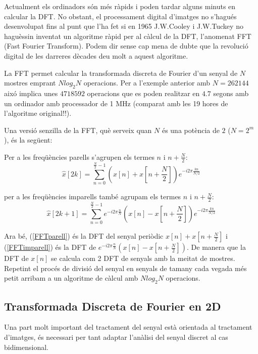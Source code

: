 \documentclass{article}
\begin{document}
Actualment els ordinadors s\'on m\'es r\`apids i poden tardar alguns minuts en calcular
la DFT. No obstant, el processament digital d'imatges no s'hagu\'es desenvolupat fins 
al punt que l'ha fet si en 1965 J.W.Cooley i J.W.Tuckey no hagu\`essin inventat un
algoritme r\`apid per al c\`alcul de la DFT, l'anomenat FFT (Fast Fourier Transform).
Podem dir sense cap mena de dubte que la revoluci\'o digital de les darreres d\`ecades deu molt
a aquest algoritme.

La FFT permet calcular la transformada discreta de Fourier d'un senyal de $N$ mostres
emprant $N log_2 N$ operacions. Per a l'exemple anterior amb $N=262144$ aix\'o implica unes
$4718592$ operacions que es poden realitzar en $4.7$ segons amb un ordinador amb processador
de 1 MHz (comparat amb les 19 hores de l'algoritme original!!).

Una versi\'o senzilla de la FFT, qu\`e serveix quan $N$ \'es una pot\`encia de $2$ 
($N=2^m$), \'es la seg\"uent:

Per a les freq\"u\`encies parells s'agrupen els termes $n$ i $n+\frac{N}{2}$:
\begin{equation}
\label{FFTparell}
\hat{x}[2k]=\sum_{n=0}^{\frac{N}{2}-1} (x[n]+x[n+\frac{N}{2}]) e^{-i 2 \pi \frac{k n}{N/2}}
\end{equation}

\noindent
per a les freq\"u\`encies imparells tamb\'e agrupam els termes $n$ i $n+\frac{N}{2}$:
\begin{equation}
\label{FFTimparell}
\hat{x}[2k+1]=\sum_{n=0}^{\frac{N}{2}-1} e^{-i 2 \pi \frac{n}{N}} 
(x[n]-x[n+\frac{N}{2}]) e^{-i 2 \pi \frac{k n}{N/2}}
\end{equation}

Ara b\'e, (\ref{FFTparell}) \'es la DFT del senyal peri\`odic $x[n]+x[n+\frac{N}{2}]$
i (\ref{FFTimparell}) \'es la DFT de $e^{-i 2 \pi \frac{n}{N}} (x[n]-x[n+\frac{N}{2}])$.
De manera que la DFT de $x[n]$ se calcula com 2 DFT de senyals amb la meitat de mostres.
Repetint el proc\'es de divisi\'o del senyal en senyals de tamany cada vegada m\'es
petit arribam a un algoritme de c\`alcul amb $N log_2 N$ operacions.


\subsection{Transformada Discreta de Fourier en 2D}
Una part molt important del tractament del senyal est\`a orientada al tractament 
d'imatges, \'es necessari per tant adaptar l'an\`alisi del senyal discret al cas
bidimensional.
\end{document}
